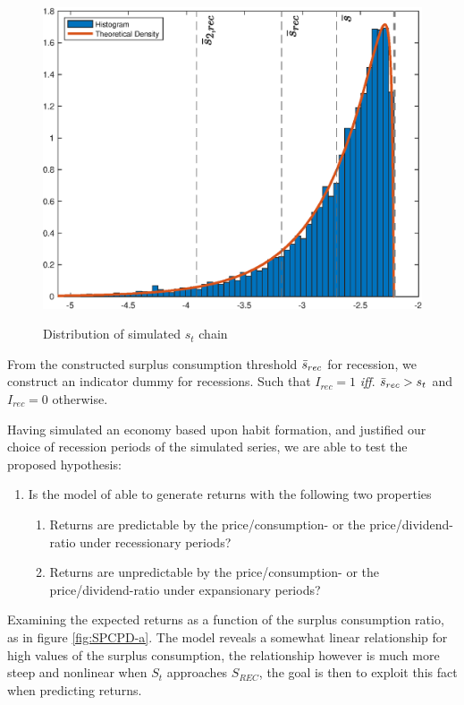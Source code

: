 \begin{figure}[H]
    \centering
    \caption{Distribution of simulated $s_t$ chain}
    \includegraphics[width=\textwidth]{Figures/DistributionS_t.eps}
    \label{fig:DistriSt}
\end{figure}
From the constructed surplus consumption threshold $\Bar{s}_{rec}$ for recession, we construct an indicator dummy for recessions. Such that $I_{rec} = 1$ \textit{iff}. $\Bar{s}_{rec} > s_t$ and $I_{rec}=0$ otherwise.

Having simulated an economy based upon habit formation, and justified our choice of recession periods of the simulated series, we are able to test the proposed hypothesis:
\begin{enumerate}
    \item Is the model of \citet{Campbell1999} able to generate returns with the following two properties
    \begin{enumerate}
        \item Returns are predictable by the price/consumption- or the price/dividend-ratio under recessionary periods?
        \item Returns are unpredictable by the price/consumption- or the price/dividend-ratio under expansionary periods?
    \end{enumerate}
\end{enumerate}
Examining the expected returns as a function of the surplus consumption ratio, as in figure \ref{fig:SPCPD-a}. The model reveals a somewhat linear relationship for high values of the surplus consumption, the relationship however is much more steep and nonlinear when $S_t$ approaches ${S}_{REC}$, the goal is then to exploit this fact when predicting returns.


